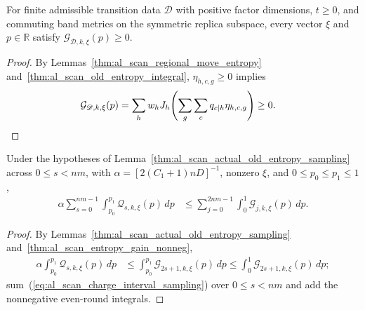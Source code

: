 \begin{lemma}
    \label{thm:al_scan_entropy_gain_nonneg}
    \leanok
    For finite admissible transition data $\mathscr D$ with positive factor
    dimensions, $t\ge0$, and commuting band metrics on the symmetric replica
    subspace, every vector $\xi$ and $p\in\mathbb R$ satisfy
    $\mathcal G_{\mathscr D,k,\xi}(p)\ge0$.
\end{lemma}
\begin{proof}\leanok
    By Lemmas~\ref{thm:al_scan_regional_move_entropy}
    and~\ref{thm:al_scan_old_entropy_integral}, $\eta_{h,c,g}\ge0$ implies
    \begin{align}
        \mathcal G_{\mathscr D,k,\xi}(p)
         & =\sum_h w_h J_h\!\left(\sum_g\sum_c q_{c\mid h}\eta_{h,c,g}\right)\ge0.
        \notag
    \end{align}
\end{proof}

\begin{lemma}
    \label{thm:al_scan_actual_charge_sum_sampling}
    \leanok
    Under the hypotheses of Lemma~\ref{thm:al_scan_actual_old_entropy_sampling}
    across $0\le s<nm$, with $\alpha=[2(C_1+1)nD]^{-1}$, nonzero $\xi$, and
    $0\le p_0\le p_1\le1$,
    \begin{align}
        \alpha\sum_{s=0}^{nm-1}\int_{p_0}^{p_1}
        \mathcal Q_{s,k,\xi}(p)\,dp
         & \le \sum_{j=0}^{2nm-1}\int_0^1
        \mathcal G_{j,k,\xi}(p)\,dp.
        \label{eq:al_scan_charge_sum_sampling}
    \end{align}
\end{lemma}
\begin{proof}\leanok
    By Lemmas~\ref{thm:al_scan_actual_old_entropy_sampling}
    and~\ref{thm:al_scan_entropy_gain_nonneg},
    \begin{align}
        \alpha\int_{p_0}^{p_1}\mathcal Q_{s,k,\xi}(p)\,dp
         & \le\int_{p_0}^{p_1}\mathcal G_{2s+1,k,\xi}(p)\,dp
        \le\int_0^1\mathcal G_{2s+1,k,\xi}(p)\,dp;
        \label{eq:al_scan_charge_interval_sampling}
    \end{align}
    sum~(\ref{eq:al_scan_charge_interval_sampling}) over $0\le s<nm$ and add the
    nonnegative even-round integrals.
\end{proof}

